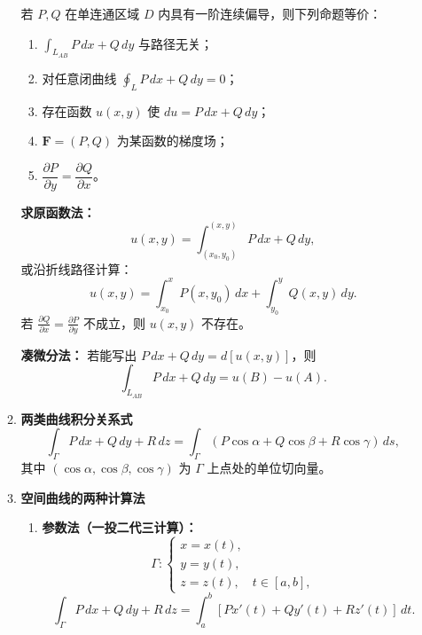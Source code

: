 \begin{enumerate}
\begin{enumerate}
                        若 $P,Q$ 在单连通区域 $D$ 内具有一阶连续偏导，则下列命题等价：
                        \begin{enumerate}[label=(\alph*)]
                              \item $\int_{L_{AB}} P\,dx+Q\,dy$ 与路径无关；
                              \item 对任意闭曲线 $\oint_L P\,dx+Q\,dy=0$；
                              \item 存在函数 $u(x,y)$ 使 $du = P\,dx + Q\,dy$；
                              \item $\mathbf{F}=(P,Q)$ 为某函数的梯度场；
                              \item $\dfrac{\partial P}{\partial y}=\dfrac{\partial Q}{\partial x}$。
                        \end{enumerate}

                        \textbf{求原函数法：}
                        \[
                              u(x,y) = \int_{(x_0,y_0)}^{(x,y)} P\,dx + Q\,dy,
                        \]
                        或沿折线路径计算：
                        \[
                              u(x,y) = \int_{x_0}^{x} P(x,y_0)\,dx + \int_{y_0}^{y} Q(x,y)\,dy.
                        \]
                        若 $\frac{\partial Q}{\partial x}=\frac{\partial P}{\partial y}$ 不成立，则 $u(x,y)$ 不存在。

                        \textbf{凑微分法：}
                        若能写出 $P\,dx+Q\,dy=d[u(x,y)]$，则
                        \[
                              \int_{L_{AB}} P\,dx + Q\,dy = u(B)-u(A).
                        \]

                  \item \textbf{两类曲线积分关系式}
                        \[
                              \int_{\Gamma} P\,dx + Q\,dy + R\,dz
                              = \int_{\Gamma} (P\cos\alpha + Q\cos\beta + R\cos\gamma)\,ds,
                        \]
                        其中 $(\cos\alpha,\cos\beta,\cos\gamma)$ 为 $\Gamma$ 上点处的单位切向量。

                  \item \textbf{空间曲线的两种计算法}
                        \begin{enumerate}
                              \item \textbf{参数法（一投二代三计算）：}
                                    \[
                                          \Gamma:\begin{cases}
                                                x=x(t), \\
                                                y=y(t), \\
                                                z=z(t),\quad t\in[a,b],
                                          \end{cases}
                                    \]
                                    \[
                                          \int_{\Gamma} P\,dx+Q\,dy+R\,dz
                                          = \int_a^b [P x'(t)+Q y'(t)+R z'(t)]\,dt.
                                    \]


\end{enumerate}
\end{enumerate}
\end{enumerate}
